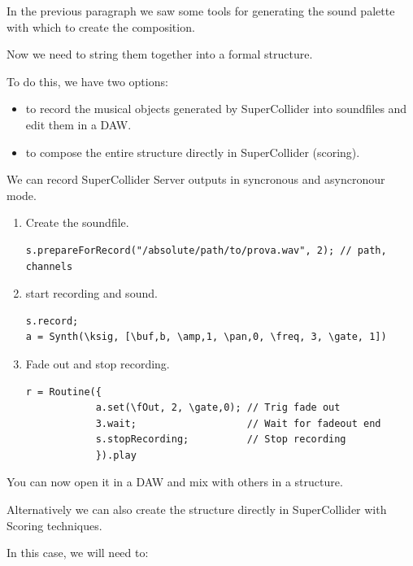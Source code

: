 In the previous paragraph we saw some tools for generating the sound palette with which to create the composition.

Now we need to string them together into a formal structure.

To do this, we have two options:

\begin{itemize}
\tightlist
\item to record the musical objects generated by SuperCollider into soundfiles and edit them in a DAW.
\item to compose the entire structure directly in SuperCollider (scoring).
\end{itemize}

We can record SuperCollider Server outputs in syncronous and asyncronour mode.

\begin{enumerate}
\def\labelenumi{\arabic{enumi}.}
\tightlist

\item Create the soundfile.
\begin{lstlisting}[frame=single] 
s.prepareForRecord("/absolute/path/to/prova.wav", 2); // path, channels
\end{lstlisting}

\item start recording and sound.
\begin{lstlisting}[frame=single] 
s.record;
a = Synth(\ksig, [\buf,b, \amp,1, \pan,0, \freq, 3, \gate, 1])
\end{lstlisting}

\item Fade out and stop recording.
\begin{lstlisting}[frame=single] 
r = Routine({
            a.set(\fOut, 2, \gate,0); // Trig fade out
            3.wait;                   // Wait for fadeout end
            s.stopRecording;          // Stop recording
            }).play
\end{lstlisting}
\end{enumerate}

You can now open it in a DAW and mix with others in a structure.

Alternatively we can also create the structure directly in SuperCollider with Scoring techniques.

In this case, we will need to: 

